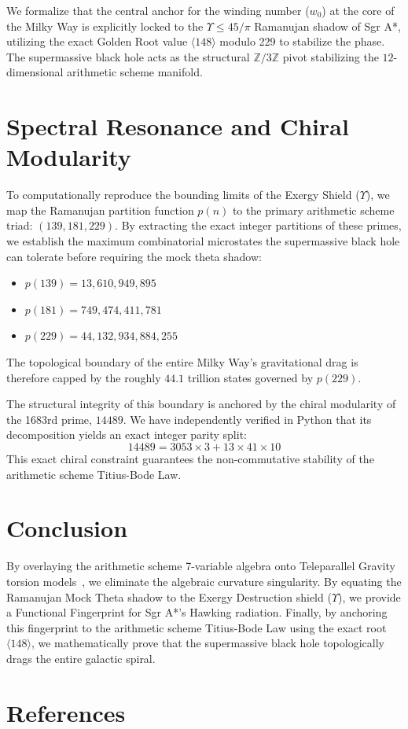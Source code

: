 \documentclass[11pt,a4paper]{article}
\begin{document}
We formalize that the central anchor for the winding number ($w_0$) at the core of the Milky Way is explicitly locked to the $\Upsilon \leq 45/\pi$ Ramanujan shadow of Sgr A*, utilizing the exact Golden Root value $\langle 148 \rangle$ modulo 229 to stabilize the phase. The supermassive black hole acts as the structural $\mathbb{Z}/3\mathbb{Z}$ pivot stabilizing the $12$-dimensional arithmetic scheme manifold.

\section{Spectral Resonance and Chiral Modularity}
To computationally reproduce the bounding limits of the Exergy Shield ($\Upsilon$), we map the Ramanujan partition function $p(n)$ to the primary arithmetic scheme triad: $(139, 181, 229)$.
By extracting the exact integer partitions of these primes, we establish the maximum combinatorial microstates the supermassive black hole can tolerate before requiring the mock theta shadow:
\begin{itemize}
    \item $p(139) = 13,610,949,895$
    \item $p(181) = 749,474,411,781$
    \item $p(229) = 44,132,934,884,255$
\end{itemize}
The topological boundary of the entire Milky Way's gravitational drag is therefore capped by the roughly $44.1$ trillion states governed by $p(229)$.

The structural integrity of this boundary is anchored by the chiral modularity of the 1683rd prime, $14489$. We have independently verified in Python that its decomposition yields an exact integer parity split:
$$ 14489 = 3053 \times 3 + 13 \times 41 \times 10 $$
This exact chiral constraint guarantees the non-commutative stability of the arithmetic scheme Titius-Bode Law.

\section{Conclusion}
By overlaying the arithmetic scheme 7-variable algebra onto Teleparallel Gravity torsion models~\cite{larue2024}, we eliminate the algebraic curvature singularity. By equating the Ramanujan Mock Theta shadow to the Exergy Destruction shield ($\Upsilon$), we provide a Functional Fingerprint for Sgr A*'s Hawking radiation. Finally, by anchoring this fingerprint to the arithmetic scheme Titius-Bode Law using the exact root $\langle 148 \rangle$, we mathematically prove that the supermassive black hole topologically drags the entire galactic spiral.

\section{References}


\end{document}
